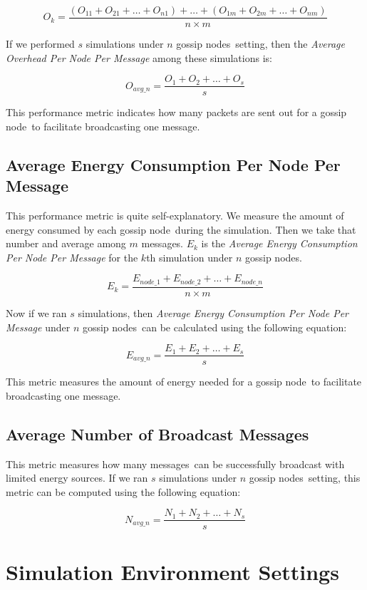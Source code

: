 \documentclass[onehalf,11pt]{beavtex}
\newcommand{\msgs}{messages}
\newcommand{\msg}{message}
\newcommand{\gn}{gossip node}
\newcommand{\gns}{gossip nodes}
\begin{document}
\[ O_{k} = \frac{(O_{11} + O_{21} + \ldots + O_{n1})  + \ldots + (O_{1m} + O_{2m} + \ldots + O_{nm})}{n\times m} \]

If we performed $s$ simulations under $n$ \gns ~setting, then the \emph{Average Overhead Per Node Per Message} among these simulations is:

\[ O_{avg\_n} = \frac{O_1 + O_2 + \ldots + O_s}{s} \]


This performance metric indicates how many packets are sent out for a \gn ~to facilitate broadcasting one \msg. 

\subsection{Average Energy Consumption Per Node Per Message}

This performance metric is quite self-explanatory. We measure the amount of energy consumed by each \gn ~during the simulation. Then we take that number and average among $m$ \msgs. $E_k$ is the \emph{Average Energy Consumption Per Node Per Message} for the $k$th simulation under $n$ \gns.

\[ E_k = \frac{E_{node\_1} + E_{node\_2} + \ldots + E_{node\_n}}{n\times m} \]

Now if we ran $s$ simulations, then \emph{Average Energy Consumption Per Node Per Message} under $n$ \gns ~can be calculated using the following equation:

\[ E_{avg\_n} = \frac{E_1 + E_2 + \ldots + E_s}{s} \]

This metric measures the amount of energy needed for a \gn ~to facilitate broadcasting one \msg. 

\subsection{Average Number of Broadcast Messages}

This metric measures how many \msgs ~can be successfully broadcast with limited energy sources. If we ran $s$ simulations under $n$ \gns ~setting, this metric can be computed using the following equation:

\[ N_{avg\_n} = \frac{N_1 + N_2 + \dots + N_s}{s} \]

\section{Simulation Environment Settings}
\end{document}

